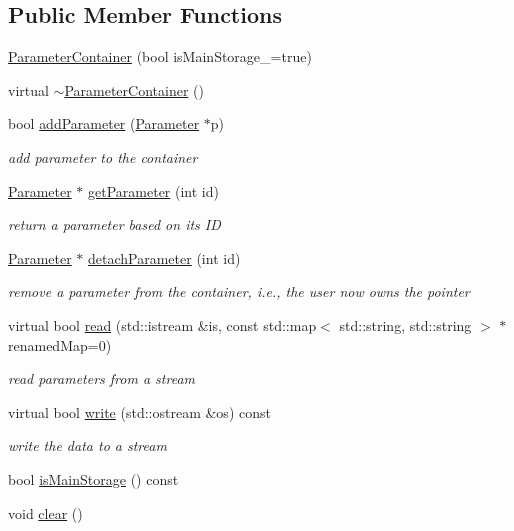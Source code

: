 \subsection*{Public Member Functions}
\begin{DoxyCompactItemize}
\item 
\mbox{\hyperlink{classg2o_1_1_parameter_container_a6047d0206008b5cbb366be0fe03246b4}{Parameter\+Container}} (bool is\+Main\+Storage\+\_\+=true)
\item 
virtual \mbox{\hyperlink{classg2o_1_1_parameter_container_a186660e1ef0350798a549b247365b295}{$\sim$\+Parameter\+Container}} ()
\item 
bool \mbox{\hyperlink{classg2o_1_1_parameter_container_a9c0b1376e780b177f2d36c4ee4f873d7}{add\+Parameter}} (\mbox{\hyperlink{classg2o_1_1_parameter}{Parameter}} $\ast$p)
\begin{DoxyCompactList}\small\item\em add parameter to the container \end{DoxyCompactList}\item 
\mbox{\hyperlink{classg2o_1_1_parameter}{Parameter}} $\ast$ \mbox{\hyperlink{classg2o_1_1_parameter_container_ad55d9e6d2adaa4680f74be98e2ae3784}{get\+Parameter}} (int id)
\begin{DoxyCompactList}\small\item\em return a parameter based on its ID \end{DoxyCompactList}\item 
\mbox{\hyperlink{classg2o_1_1_parameter}{Parameter}} $\ast$ \mbox{\hyperlink{classg2o_1_1_parameter_container_a6e57cf684d92f0ceeba8b4923fa41864}{detach\+Parameter}} (int id)
\begin{DoxyCompactList}\small\item\em remove a parameter from the container, i.\+e., the user now owns the pointer \end{DoxyCompactList}\item 
virtual bool \mbox{\hyperlink{classg2o_1_1_parameter_container_ae5883ac8e2313cab310cf067b0ba12bf}{read}} (std\+::istream \&is, const std\+::map$<$ std\+::string, std\+::string $>$ $\ast$renamed\+Map=0)
\begin{DoxyCompactList}\small\item\em read parameters from a stream \end{DoxyCompactList}\item 
virtual bool \mbox{\hyperlink{classg2o_1_1_parameter_container_a15c92fab12ad8f3bd51b3f555e95b00e}{write}} (std\+::ostream \&os) const
\begin{DoxyCompactList}\small\item\em write the data to a stream \end{DoxyCompactList}\item 
bool \mbox{\hyperlink{classg2o_1_1_parameter_container_a201d0b120e7b8d54c99d73c8f4d04846}{is\+Main\+Storage}} () const
\item 
void \mbox{\hyperlink{classg2o_1_1_parameter_container_aff4d3792e2ebd022ebd4a1534b88b773}{clear}} ()
\end{DoxyCompactItemize}
